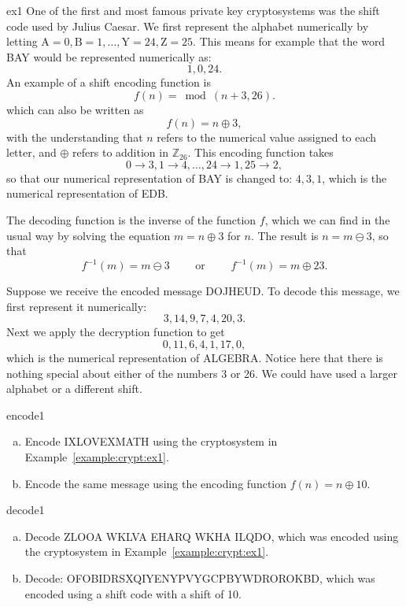 \begin{example}{ex1}
One of the first and most famous private key cryptosystems was the
shift code used by Julius Caesar.  We first represent the alphabet numerically by
letting $\mbox{A}  = 0, \mbox{B}  = 1, \ldots, \mbox{Y} = 24, \mbox{Z} = 25$. This means for example that the word BAY would be represented numerically as:
$$ 1,0,24.$$
An example of a shift encoding function is
$$
f(n) =\bmod( n + 3,  26).
$$
which can also be written as
$$
f(n) =n \oplus 3,
$$
with the understanding that $n$ refers to the numerical value assigned to each letter, and $\oplus$ refers to addition in $\mathbb{Z}_{26}$. This encoding function takes 
$$0 \rightarrow 3, 1 \rightarrow 4, \ldots, 24 \rightarrow 1,25 \rightarrow 2,$$
so that our numerical representation of BAY is changed to:  $ 4,3,1$, which is the numerical representation of EDB.

The decoding
function is the inverse of the function $f$, which we can find in the usual way by solving the equation $m = n \oplus 3$ for $n$.
The result is $n = m \ominus 3$, so that
$$
f^{-1}(m) = m \ominus 3 \qquad \textrm{ or }\qquad f^{-1}(m) = m \oplus 23.
$$

Suppose we receive the encoded message DOJHEUD. To decode this
message, we first represent it numerically:  
$$
3, 14, 9, 7, 4, 20, 3.
$$
Next we apply the decryption function to get
$$
0, 11, 6, 4, 1, 17, 0,
$$
which is the numerical representation of ALGEBRA. Notice here that there is nothing special about either of
the numbers 3 or 26. We could have used a larger alphabet or a
different shift.
\end{example}

\begin{exercise}{encode1}
\begin{enumerate}[(a)]
\item
Encode IXLOVEXMATH using the cryptosystem in Example~\ref{example:crypt:ex1}.
\item
Encode the same message using the encoding function $f(n) =n \oplus 10$.
\end{enumerate}
\end{exercise} 
 \medskip

\begin{exercise}{decode1}
\begin{enumerate}[(a)]
\item
Decode ZLOOA WKLVA EHARQ WKHA ILQDO, which was encoded using the
cryptosystem in Example~\ref{example:crypt:ex1}.
\item
Decode: OFOBIDRSXQIYENYPVYGCPBYWDROROKBD, which was encoded using a shift code with a shift of 10.
\end{enumerate}
\end{exercise} 

